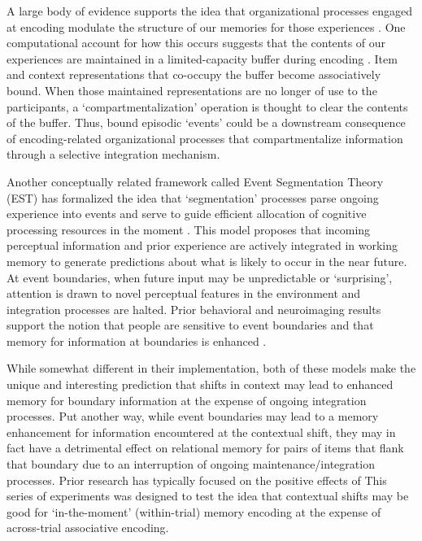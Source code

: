 A large body of evidence supports the idea that organizational processes
engaged at encoding modulate the structure of our memories for those
experiences
\autocites{atkinson_control_1971}{farrell_temporal_2012}{lee_item_1981}{murdock_distributed_1983}{raaijmakers_search_1981}.
One computational account for how this occurs suggests that the contents
of our experiences are maintained in a limited-capacity buffer during
encoding \autocites{lehman_global_2009}{lehman_buffer_2013}. Item and
context representations that co-occupy the buffer become associatively
bound. When those maintained representations are no longer of use to the
participants, a `compartmentalization' operation is thought to clear the
contents of the buffer. Thus, bound episodic `events' could be a
downstream consequence of encoding-related organizational processes that
compartmentalize information through a selective integration mechanism.

Another conceptually related framework called Event Segmentation Theory
(EST) has formalized the idea that `segmentation' processes parse
ongoing experience into events and serve to guide efficient allocation
of cognitive processing resources in the moment
\autocites{reynolds_computational_2007}{zacks_event_2007}. This model
proposes that incoming perceptual information and prior experience are
actively integrated in working memory to generate predictions about what
is likely to occur in the near future. At event boundaries, when future
input may be unpredictable or `surprising', attention is drawn to novel
perceptual features in the environment and integration processes are
halted. Prior behavioral and neuroimaging results support the notion
that people are sensitive to event boundaries
\autocites{radvansky_across_2012}{speer_temporal_2005}{zacks_event_2007}{swallow_event_2009}{zacks_human_2001}
and that memory for information at boundaries is enhanced
\autocites{boltz_temporal_1992}{newtson_perceptual_1976}{schwan_cognitive_2004}.

While somewhat different in their implementation, both of these models
make the unique and interesting prediction that shifts in context may
lead to enhanced memory for boundary information at the expense of
ongoing integration processes. Put another way, while event boundaries
may lead to a memory enhancement for information encountered at the
contextual shift, they may in fact have a detrimental effect on
relational memory for pairs of items that flank that boundary due to an
interruption of ongoing maintenance/integration processes. Prior
research has typically focused on the positive effects of This series of
experiments was designed to test the idea that contextual shifts may be
good for `in-the-moment' (within-trial) memory encoding at the expense
of across-trial associative encoding.

